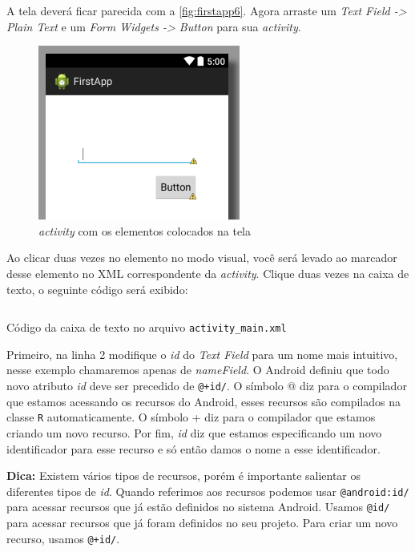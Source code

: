 \documentclass[a4paper,12pt,brazil,oneside]{book}
\begin{document}
\begin{singlespace}
A tela deverá ficar parecida com a \autoref{fig:firstapp6}. Agora arraste um \textit{Text Field -> Plain Text} e um \textit{Form Widgets -> Button} para sua \emph{activity}.


\begin{figure}[H]
  \centering
  \includegraphics[width=.4\textwidth]{figuras/firstapp/firstapp7.png}
  \caption{\emph{activity} com os elementos colocados na tela}
  \label{fig:firstapp7}
\end{figure}

Ao clicar duas vezes no elemento no modo visual, você será levado ao marcador desse elemento no XML correspondente da \emph{activity}. Clique duas vezes na caixa de texto, o seguinte código será exibido:

\begin{listing}
\inputminted[linenos=true,fontsize=\small,frame=lines, framesep=2mm, tabsize=2,numbersep=5pt]{xml}{src/firstapp/1.xml}
\caption{Código da caixa de texto no arquivo \texttt{activity\_main.xml}}
\end{listing}

Primeiro, na linha 2 modifique o \emph{id} do \emph{Text Field} para um nome mais intuitivo, nesse exemplo chamaremos apenas de \emph{nameField}. O Android definiu que todo novo atributo \emph{id} deve ser precedido de \texttt{@+id/}. O símbolo @ diz para o compilador que estamos acessando os recursos do Android, esses recursos são compilados na classe \texttt{R} automaticamente. O símbolo + diz para o compilador que estamos criando um novo recurso. Por fim, \emph{id} diz que estamos especificando um novo identificador para esse recurso e só então damos o nome a esse identificador.

\begin{framed}
\textbf{Dica:} Existem vários tipos de recursos, porém é importante salientar os diferentes tipos de \emph{id}. Quando referimos aos recursos podemos usar \texttt{@android:id/} para acessar recursos que já estão definidos no sistema Android. Usamos \texttt{@id/} para acessar recursos que já foram definidos no seu projeto. Para criar um novo recurso, usamos \texttt{@+id/}.
\end{framed}


\end{singlespace}
\end{document}
